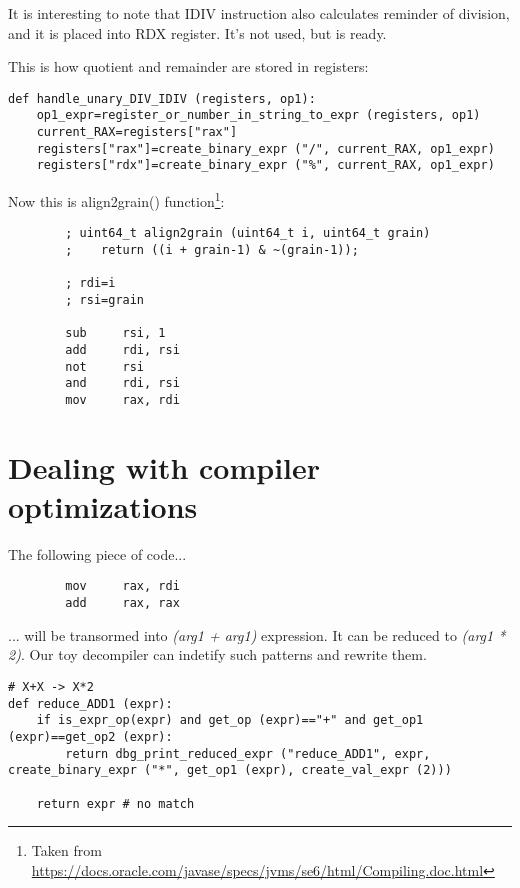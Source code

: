 ﻿\documentclass[12pt]{article}
\begin{document}
It is interesting to note that IDIV instruction also calculates reminder of division, and it is placed into RDX register.
It's not used, but is ready.

This is how quotient and remainder are stored in registers:

\begin{lstlisting}
def handle_unary_DIV_IDIV (registers, op1):
    op1_expr=register_or_number_in_string_to_expr (registers, op1)
    current_RAX=registers["rax"]
    registers["rax"]=create_binary_expr ("/", current_RAX, op1_expr)
    registers["rdx"]=create_binary_expr ("%", current_RAX, op1_expr)
\end{lstlisting}

Now this is align2grain() function\footnote{Taken from \url{https://docs.oracle.com/javase/specs/jvms/se6/html/Compiling.doc.html}}:

\begin{lstlisting}
        ; uint64_t align2grain (uint64_t i, uint64_t grain)
        ;    return ((i + grain-1) & ~(grain-1));

        ; rdi=i
        ; rsi=grain

        sub     rsi, 1
        add     rdi, rsi
        not     rsi
        and     rdi, rsi
        mov     rax, rdi
\end{lstlisting}



\section{Dealing with compiler optimizations}

The following piece of code...

\begin{lstlisting}
        mov     rax, rdi
        add     rax, rax
\end{lstlisting}

... will be transormed into \textit{(arg1 + arg1)} expression.
It can be reduced to \textit{(arg1 * 2)}.
Our toy decompiler can indetify such patterns and rewrite them.

\begin{lstlisting}
# X+X -> X*2
def reduce_ADD1 (expr):
    if is_expr_op(expr) and get_op (expr)=="+" and get_op1 (expr)==get_op2 (expr):
        return dbg_print_reduced_expr ("reduce_ADD1", expr, create_binary_expr ("*", get_op1 (expr), create_val_expr (2)))

    return expr # no match
\end{lstlisting}
\end{document}
